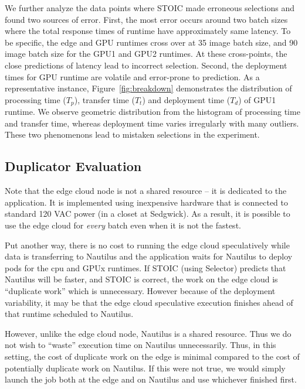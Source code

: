 We further analyze the data points where STOIC made erroneous selections and found two sources of error. First, the most error occurs around two batch sizes where the total response times of runtime have approximately same latency. To be specific, the edge and GPU runtimes cross over at 35 image batch size, and 90 image batch size for the GPU1 and GPU2 runtimes. At these cross-points, the close predictions of latency lead to incorrect selection. Second, the deployment times for GPU runtime are volatile and error-prone to prediction. As a representative instance, Figure~\ref{fig:breakdown} demonstrates the distribution of processing time ($T_p$), transfer time ($T_t$) and deployment time ($T_d$) of GPU1 runtime. We observe geometric distribution from the histogram of processing time and transfer time, whereas deployment time varies irregularly with many outliers. These two phenomenons lead to mistaken selections in the experiment.

\subsection{Duplicator Evaluation}

Note that the edge cloud node is not a shared resource -- it is dedicated to the application. It is implemented using inexpensive hardware that is connected to standard 120 VAC power (in a closet at Sedgwick).  As a result, it is possible to use the edge cloud for \textit{every} batch even when it is not the fastest.  

Put another way, there is no cost to running the edge cloud speculatively while data is transferring to Nautilus and the application waits for Nautilus to deploy pods for the cpu and GPUx runtimes. If STOIC (using Selector) predicts that Nautilus will be faster, and STOIC is correct, the work on the edge cloud is ``duplicate work'' which is unnecessary. However because of the deployment variability, it may be that the edge cloud speculative execution finishes ahead of that runtime scheduled to Nautilus.

However, unlike the edge cloud node, Nautilus is a shared resource.  Thus we do not wish to ``waste'' execution time on Nautilus unnecessarily. Thus, in this setting, the cost of duplicate work on the edge is minimal compared to the cost of potentially duplicate work on Nautilus. If this were not true, we would simply launch the job both at the edge and on Nautilus and use whichever finished first.

